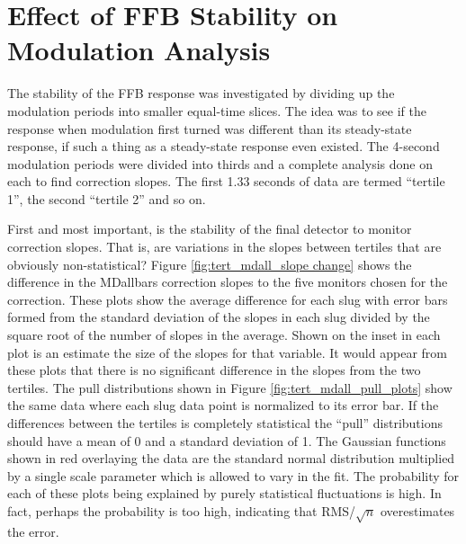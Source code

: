 
\chapter{Effect of FFB Stability on Modulation Analysis} 
\captionsetup{justification=justified,singlelinecheck=false}

\label{AppendixC}


The stability of the FFB response was investigated by dividing up the modulation periods into smaller equal-time slices. The idea was to see if the response when modulation first turned was different than its steady-state response, if such a thing as a steady-state response even existed. The 4-second modulation periods were divided into thirds and a complete analysis done on each to find correction slopes. The first 1.33 seconds of data are termed ``tertile 1'', the second ``tertile 2'' and so on. 

First and most important, is the stability of the final detector to monitor correction slopes. That is, are variations in the slopes between tertiles that are obviously non-statistical? Figure \ref{fig:tert_mdall_slope change} shows the difference in the MDallbars correction slopes to the five monitors chosen for the correction. These plots show the average difference for each slug with error bars formed from the standard deviation of the slopes in each slug divided by the square root of the number of slopes in the average. Shown on the inset in each plot is an estimate the size of the slopes for that variable. It would appear from these plots that there is no significant difference in the slopes from the two tertiles. The pull distributions shown in Figure \ref{fig:tert_mdall_pull_plots} show the same data where each slug data point is normalized to its error bar. If the differences between the tertiles is completely statistical the ``pull'' distributions should have a mean of 0 and a standard deviation of 1. The Gaussian functions shown in red overlaying the data are the standard normal distribution multiplied by a single scale parameter which is allowed to vary in the fit. The probability for each of these plots being explained by purely statistical fluctuations is high. In fact, perhaps the probability is too high, indicating that RMS/$\sqrt{n}$ overestimates the error.  

